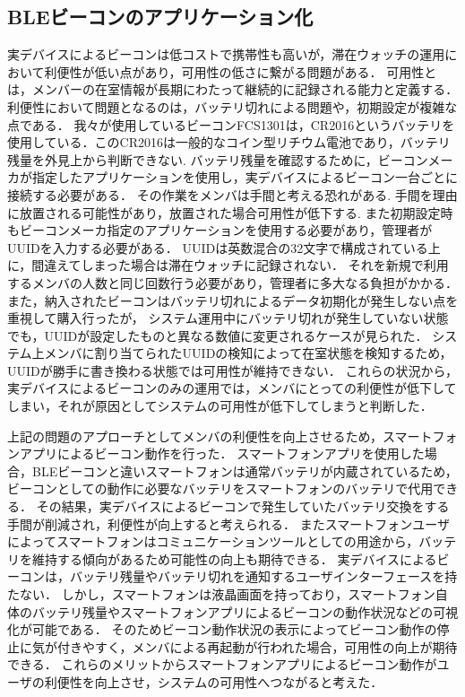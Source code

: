 \subsection{ BLEビーコンのアプリケーション化}
実デバイスによるビーコンは低コストで携帯性も高いが，滞在ウォッチの運用において利便性が低い点があり，可用性の低さに繋がる問題がある．
可用性とは，メンバーの在室情報が長期にわたって継続的に記録される能力と定義する．  
利便性において問題となるのは，バッテリ切れによる問題や，初期設定が複雑な点である．
我々が使用しているビーコンFCS1301は，CR2016というバッテリを使用している．このCR2016は一般的なコイン型リチウム電池であり，バッテリ残量を外見上から判断できない.
バッテリ残量を確認するために，ビーコンメーカが指定したアプリケーションを使用し，実デバイスによるビーコン一台ごとに接続する必要がある．
その作業をメンバは手間と考える恐れがある.
手間を理由に放置される可能性があり，放置された場合可用性が低下する.
また初期設定時もビーコンメーカ指定のアプリケーションを使用する必要があり，管理者がUUIDを入力する必要がある．
UUIDは英数混合の32文字で構成されている上に，間違えてしまった場合は滞在ウォッチに記録されない．
それを新規で利用するメンバの人数と同じ回数行う必要があり，管理者に多大なる負担がかかる．
また，納入されたビーコンはバッテリ切れによるデータ初期化が発生しない点を重視して購入行ったが，
システム運用中にバッテリ切れが発生していない状態でも，UUIDが設定したものと異なる数値に変更されるケースが見られた．
システム上メンバに割り当てられたUUIDの検知によって在室状態を検知するため，UUIDが勝手に書き換わる状態では可用性が維持できない．
これらの状況から，実デバイスによるビーコンのみの運用では，メンバにとっての利便性が低下してしまい，それが原因としてシステムの可用性が低下してしまうと判断した．

上記の問題のアプローチとしてメンバの利便性を向上させるため，スマートフォンアプリによるビーコン動作を行った．
スマートフォンアプリを使用した場合，BLEビーコンと違いスマートフォンは通常バッテリが内蔵されているため，ビーコンとしての動作に必要なバッテリをスマートフォンのバッテリで代用できる．
その結果，実デバイスによるビーコンで発生していたバッテリ交換をする手間が削減され，利便性が向上すると考えられる．
またスマートフォンユーザによってスマートフォンはコミュニケーションツールとしての用途から，バッテリを維持する傾向があるため可能性の向上も期待できる．
実デバイスによるビーコンは，バッテリ残量やバッテリ切れを通知するユーザインターフェースを持たない．
しかし，スマートフォンは液晶画面を持っており，スマートフォン自体のバッテリ残量やスマートフォンアプリによるビーコンの動作状況などの可視化が可能である．
そのためビーコン動作状況の表示によってビーコン動作の停止に気が付きやすく，メンバによる再起動が行われた場合，可用性の向上が期待できる．
これらのメリットからスマートフォンアプリによるビーコン動作がユーザの利便性を向上させ，システムの可用性へつながると考えた．


